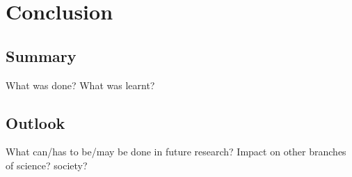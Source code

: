 \chapter{Conclusion}
\label{sec:Conclusion}

\section{Summary}
What was done? What was learnt?

\section{Outlook}
What can/has to be/may be done in future research? Impact on other branches of science? society?
